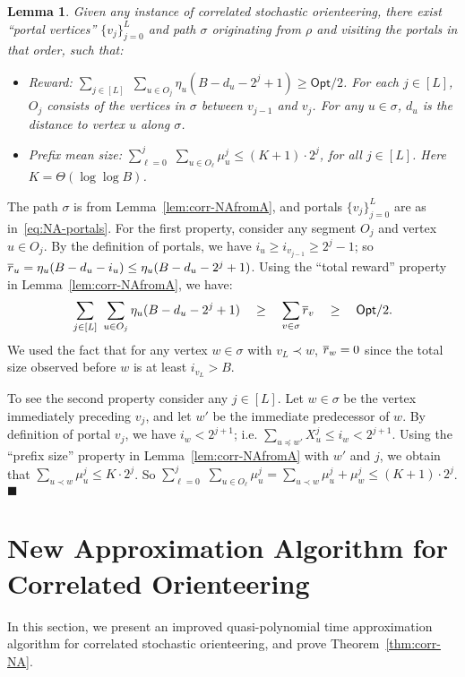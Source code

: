 \documentclass[11pt,letterpaper]{article}
\newtheorem{lemma}[theorem]{Lemma}
\numberwithin{algorithm}{section}
\newenvironment{proof}{

\noindent{\bf Proof:}}
{\hfill$\blacksquare$


}
\newcommand{\Opt}{\ensuremath{\mathsf{Opt}}\xspace}
\begin{document}
\begin{lemma}\label{lem:corr-portals}
Given any instance of correlated stochastic orienteering, there exist ``portal vertices'' $\{v_j\}_{j=0}^L$ and path $\sigma$ originating from $\rho$ and visiting the portals in that order, such that:
\begin{itemize}
\item Reward: $\sum_{j\in[L]} \,\, \sum_{u\in O_j} \eta_u(B-d_u-2^j+1) \ge \Opt/2$. For each $j\in[L]$, $O_j$ consists of the vertices in $\sigma$ between $v_{j-1}$ and $v_{j}$. For any $u\in\sigma$, $d_u$ is the distance to vertex $u$ along $\sigma$.
\item Prefix mean size: $\sum_{\ell=0}^j \,\,\sum_{u\in O_\ell} \mu^j_u \le (K+1)\cdot 2^j$, for all $j\in[L]$. Here $K=\Theta(\log\log B)$.
\end{itemize}
\end{lemma}
\begin{proof}
The path $\sigma$ is from Lemma~\ref{lem:corr-NAfromA}, and portals $\{v_j\}_{j=0}^L$ are as in~\eqref{eq:NA-portals}. For the first property, consider any segment $O_j$ and vertex $u\in O_j$. By the definition of portals, we have $i_u\ge i_{v_{j-1}} \ge 2^{j}-1$; so $\overline{r}_u=\eta_u(B-d_u-i_u)\le \eta_u(B-d_u-2^j+1)$. Using the ``total reward'' property in Lemma~\ref{lem:corr-NAfromA}, we have:
$$\sum_{j\in[L]} \,\, \sum_{u\in O_j} \eta_u(B-d_u-2^j+1) \quad \ge \quad \sum_{v\in \sigma} \rr_v \quad \ge \quad \Opt/2.$$
We used the fact that for any vertex $w\in \sigma$ with $v_L\prec w$, $\overline{r}_w=0$ since the total size observed before $w$ is at least $i_{v_L}>B$.

To see the second property consider any $j\in [L]$. Let $w\in \sigma$ be the vertex immediately preceding $v_j$, and let $w'$ be the immediate predecessor of $w$. By definition of portal $v_j$, we have $i_{w}<2^{j+1}$; i.e. $\sum_{u\preceq w'} X^j_u \le i_w < 2^{j+1}$. Using the ``prefix size'' property in Lemma~\ref{lem:corr-NAfromA} with $w'$ and $j$, we obtain that $\sum_{u\prec w}\mu^j_u\le K\cdot 2^j$. So $\sum_{\ell=0}^j \,\,\sum_{u\in O_\ell} \mu^j_u = \sum_{u\prec w}\mu^j_u + \mu^j_w \le (K+1)\cdot 2^j$.
\end{proof}

\section{New Approximation Algorithm for Correlated Orienteering} \label{sec:corr-alg}
In this section, we present an improved quasi-polynomial time approximation algorithm for correlated stochastic orienteering, and prove Theorem~\ref{thm:corr-NA}.
\end{document}
